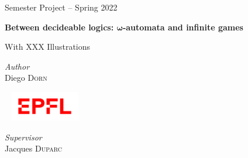 \begin{titlepage}
\begin{center}
    \Large
    \textsf{Semester Project -- Spring 2022}

    \vspace{1em}

    \textbf{\textsf{
        \Huge
        Between decideable logics: $\boldsymbol\omega$-automata and infinite games
    }}

    \begin{center}
        With XXX Illustrations
    \end{center}


    \vfill


    \vfill


    \begin{minipage}{0.3\textwidth}
        \textit{Author} \\
        Diego \textsc{Dorn}
    \end{minipage}
    ~
    \includegraphics[width=3cm]{epfl.png}
    ~
    \begin{minipage}{0.3\textwidth}
        \begin{flushright}
            \textit{Supervisor} \\
            Jacques \textsc{Duparc}
        \end{flushright}
    \end{minipage}
    \vspace{1cm}

    \vspace*{-3cm}
\end{center}
\end{titlepage}